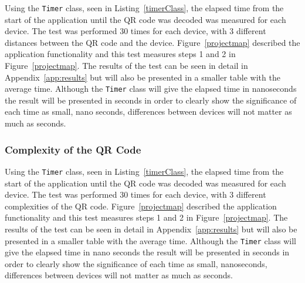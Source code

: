Using the \texttt{Timer} class, seen in Listing~\ref{timerClass}, the elapsed time from the start of the application until the QR code was decoded was measured for each device. The test was performed 30 times for each device, with 3 different distances between the QR code and the device. Figure~\ref{projectmap} described the application functionality and this test measures steps 1 and 2 in Figure~\ref{projectmap}. The results of the test can be seen in detail in Appendix~\ref{app:results} but will also be presented in a smaller table with the average time. 
Although the \texttt{Timer} class will give the elapsed time in nanoseconds the result will be presented in seconds in order to clearly show the significance of each time as small, nano seconds, differences between devices will not matter as much as seconds.

%       
%		

\subsubsection{Complexity of the QR Code}

Using the \texttt{Timer} class, seen in Listing~\ref{timerClass}, the elapsed time from the start of the application until the QR code was decoded was measured for each device. The test was performed 30 times for each device, with 3 different complexities of the QR code. Figure~\ref{projectmap} described the application functionality and this test measures steps 1 and 2 in Figure~\ref{projectmap}. The results of the test can be seen in detail in Appendix~\ref{app:results} but will also be presented in a smaller table with the average time.
Although the \texttt{Timer} class will give the elapsed time in nano seconds the result will be presented in seconds in order to clearly show the significance of each time as small, nanoseconds, differences between devices will not matter as much as seconds.

